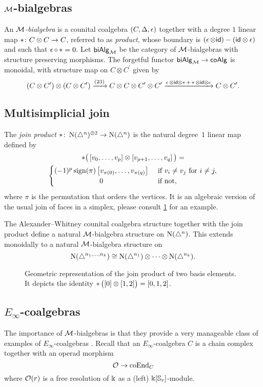 \subsection{$\mathcal{M}$-bialgebras}

An \textit{$\mathcal{M}$-bialgebra} is a counital coalgebra $(C, \operatorname{\Delta}, \operatorname{\epsilon})$ together with a degree $1$ linear map $\operatorname{\ast} \colon C \otimes C \to C$, referred to as \textit{product}, whose boundary is $(\operatorname{\epsilon} \otimes \mathsf{id}) - (\mathsf{id} \otimes \operatorname{\epsilon})$ and such that $\operatorname{\epsilon} \circ \operatorname{\ast} = 0$.
Let $\mathsf{biAlg}_{\mathcal{M}}$ be the category of $\mathcal{M}$-bialgebras with structure preserving morphisms.
The forgetful functor $\mathsf{biAlg}_{\mathcal{M}} \to \mathsf{coAlg}$ is monoidal, with structure map on $C \otimes C^\prime$ given by
\[
(C \otimes C^\prime) \otimes (C \otimes C^\prime) \xrightarrow{(23)}
C \otimes C \otimes C^\prime \otimes C^\prime
\xrightarrow{\operatorname{\epsilon} \otimes \mathsf{id} \otimes \operatorname{\ast} + \operatorname{\ast} \otimes \mathsf{id} \otimes \operatorname{\epsilon}}
C \otimes C^\prime.
\]

\subsection{Multisimplicial join}

The \textit{join product} $\ast \colon \operatorname{N}(\triangle^n)^{\otimes 2} \to \operatorname{N}(\triangle^n)$ is the natural degree~$1$ linear map defined by
\begin{multline}
\ast \big(\left[v_0, \dots, v_p \right] \ot \left[v_{p+1}, \dots, v_q\right]\big) = \\
\begin{cases} (-1)^{p} \sign(\pi) \left[v_{\pi(0)}, \dots, v_{\pi(q)}\right] & \text{ if } v_i \neq v_j \text{ for } i \neq j, \\
\hfil 0 & \text{ if not}, \end{cases}
\end{multline}
where $\pi$ is the permutation that orders the vertices.
It is an algebraic version of the usual join of faces in a simplex, please consult \cref{f:join of faces} for an example.

The Alexander--Whitney counital coalgebra structure together with the join product define a natural $\mathcal{M}$-bialgebra structure on $\operatorname{N}(\triangle^n)$. This extends monoidally to a natural $\mathcal{M}$-bialgebra structure on
\[
\operatorname{N}(\triangle^{n_1, \dots, n_k}) \cong
\operatorname{N}(\triangle^{n_1}) \otimes \dotsb \otimes \operatorname{N}(\triangle^{n_k}).
\]

\begin{figure}
	
	\caption{Geometric representation of the join product of two basis elements. It depicts the identity $\operatorname{\ast} \big( [0] \otimes [1,2] \big) = [0,1,2]$.}
	\label{f:join of faces}
\end{figure}

\subsection{\texorpdfstring{${E_\infty}$}{E-infty}-coalgebras}

The importance of $\mathcal{M}$-bialgebras is that they provide a very manageable class of examples of $E_\infty$-coalgebras \cite{medina2020prop1}.
Recall that an $E_\infty$-coalgebra $C$ is a chain complex together with an operad morphism
\[
\mathcal{O} \to \mathrm{coEnd}_C
\]
where $\mathcal{O}(r)$ is a free resolution of $\Bbbk$ as a (left) $\Bbbk[\mathbb{S}_r]$-module.